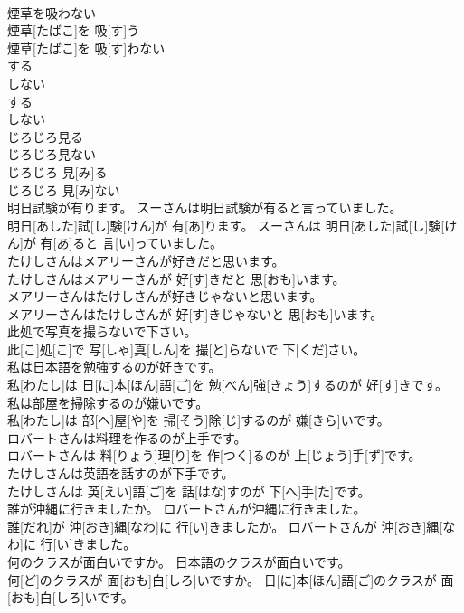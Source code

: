 \documentclass[8pt]{extreport}
\begin{document}
\begin{CJK}{UTF8}{min}
\\	煙草を吸わない	
\\	煙草[たばこ]を 吸[す]う 
\\	煙草[たばこ]を 吸[す]わない
\\	する 
\\	しない	
\\	する 
\\	しない
\\	じろじろ見る 
\\	じろじろ見ない	
\\	じろじろ 見[み]る 
\\	じろじろ 見[み]ない
\\	明日試験が有ります。 スーさんは明日試験が有ると言っていました。	
\\	明日[あした]試[し]験[けん]が 有[あ]ります。 スーさんは 明日[あした]試[し]験[けん]が 有[あ]ると 言[い]っていました。
\\	たけしさんはメアリーさんが好きだと思います。	
\\	たけしさんはメアリーさんが 好[す]きだと 思[おも]います。
\\	メアリーさんはたけしさんが好きじゃないと思います。	
\\	メアリーさんはたけしさんが 好[す]きじゃないと 思[おも]います。
\\	此処で写真を撮らないで下さい。	
\\	此[こ]処[こ]で 写[しゃ]真[しん]を 撮[と]らないで 下[くだ]さい。
\\	私は日本語を勉強するのが好きです。	
\\	私[わたし]は 日[に]本[ほん]語[ご]を 勉[べん]強[きょう]するのが 好[す]きです。
\\	私は部屋を掃除するのが嫌いです。	
\\	私[わたし]は 部[へ]屋[や]を 掃[そう]除[じ]するのが 嫌[きら]いです。
\\	ロバートさんは料理を作るのが上手です。	
\\	ロバートさんは 料[りょう]理[り]を 作[つく]るのが 上[じょう]手[ず]です。
\\	たけしさんは英語を話すのが下手です。	
\\	たけしさんは 英[えい]語[ご]を 話[はな]すのが 下[へ]手[た]です。
\\	誰が沖縄に行きましたか。 ロバートさんが沖縄に行きました。	
\\	誰[だれ]が 沖[おき]縄[なわ]に 行[い]きましたか。 ロバートさんが 沖[おき]縄[なわ]に 行[い]きました。
\\	何のクラスが面白いですか。 日本語のクラスが面白いです。	
\\	何[ど]のクラスが 面[おも]白[しろ]いですか。 日[に]本[ほん]語[ご]のクラスが 面[おも]白[しろ]いです。

\end{CJK}
\end{document}
